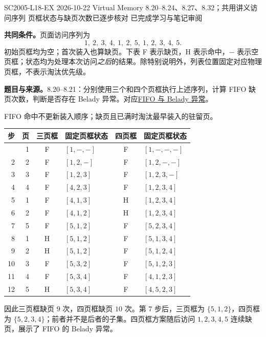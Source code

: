 \begingroup
\renewcommand{\recordid}[1]{}
\renewcommand{\relatedtopic}[2]{\hyperref[topic:#1]{#2}}

\examplemeta
  {SC2005-L18-EX}
  {2026-10-22}
  {Virtual Memory 8.20--8.24、8.27、8.32；共用讲义访问序列}
  {页框状态与缺页次数已逐步核对}
  {已完成学习与笔记审阅}

\linespread{1.15}\selectfont
\setlength{\parskip}{0.4em}

\textbf{共同条件。}页面访问序列为
\[
  1,\ 2,\ 3,\ 4,\ 1,\ 2,\ 5,\ 1,\ 2,\ 3,\ 4,\ 5.
\]
初始页框均为空；首次装入也算缺页。下表 F 表示缺页，H 表示命中，$-$ 表示空页框；状态均为处理本次访问\emph{之后}的结果。除特别说明外，列表位置固定对应物理页框，不表示淘汰优先级。

\textbf{题目与来源。}8.20--8.21：分别使用三个和四个页框执行上述序列，计算 FIFO 缺页次数，判断是否存在 Belady 异常。对应\relatedtopic{SC2005-L18-T01}{FIFO 与 Belady 异常}。

\begin{checkedsolution}
FIFO 命中不更新装入顺序；缺页且已满时淘汰最早装入的驻留页。
{\small
\begin{longtable}{@{}rrclcl@{}}
\toprule
步 & 页 & 三页框 & 固定页框状态 & 四页框 & 固定页框状态 \\
\midrule
\endhead
\bottomrule
\endfoot
1  & 1 & F & $[1,-,-]$ & F & $[1,-,-,-]$ \\
2  & 2 & F & $[1,2,-]$ & F & $[1,2,-,-]$ \\
3  & 3 & F & $[1,2,3]$ & F & $[1,2,3,-]$ \\
4  & 4 & F & $[4,2,3]$ & F & $[1,2,3,4]$ \\
5  & 1 & F & $[4,1,3]$ & H & $[1,2,3,4]$ \\
6  & 2 & F & $[4,1,2]$ & H & $[1,2,3,4]$ \\
7  & 5 & F & $[5,1,2]$ & F & $[5,2,3,4]$ \\
8  & 1 & H & $[5,1,2]$ & F & $[5,1,3,4]$ \\
9  & 2 & H & $[5,1,2]$ & F & $[5,1,2,4]$ \\
10 & 3 & F & $[5,3,2]$ & F & $[5,1,2,3]$ \\
11 & 4 & F & $[5,3,4]$ & F & $[4,1,2,3]$ \\
12 & 5 & H & $[5,3,4]$ & F & $[4,5,2,3]$ \\
\end{longtable}}
因此三页框缺页 $9$ 次，四页框缺页 $10$ 次。第 $7$ 步后，三页框为 $\{5,1,2\}$，四页框为 $\{5,2,3,4\}$；前者并不是后者的子集。四页框方案随后访问 $1,2,3,4,5$ 连续缺页，展示了 FIFO 的 Belady 异常。
\end{checkedsolution}

